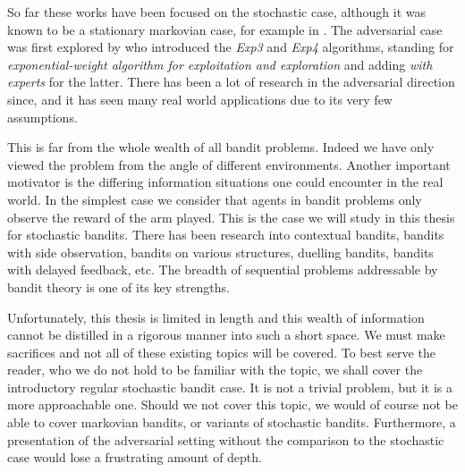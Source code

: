 So far these works have been focused on the stochastic case, although it was known to be a stationary markovian case, for example in \citet{gittins:1979} . The adversarial case was first explored by \citet{auer:1995} who introduced the {\em Exp3} and {\em Exp4} algorithms, standing for {\em exponential-weight algorithm for exploitation and exploration} and adding {\em with experts} for the latter. There has been a lot of research in the adversarial direction since, and it has seen many real world applications due to its very few assumptions.

\par This is far from the whole wealth of all bandit problems. Indeed we have only viewed the problem from the angle of different environments. Another important motivator is the differing information situations one could encounter in the real world. In the simplest case we consider that agents in bandit problems only observe the reward of the arm played. This is the case we will study in this thesis for stochastic bandits. There has been research into contextual bandits\cite{banditalgs:11}, bandits with side observation\cite{mannor:2011}, bandits on various structures\cite{kveton:2014}, duelling bandits\cite{yue:2009}, bandits with delayed feedback\cite{dudik:2011}, etc. The breadth of sequential problems addressable by bandit theory is one of its key strengths. %


	
	
\par Unfortunately, this thesis is limited in length and this wealth of information cannot be distilled in a rigorous manner into such a short space. We must make sacrifices and not all of these existing topics will be covered. To best serve the reader, who we do not hold to be familiar with the topic, we shall cover the introductory regular stochastic bandit case. It is not a trivial problem, but it is a more approachable one. Should we not cover this topic,  we would of course not be able to cover markovian bandits, or variants of stochastic bandits. Furthermore, a presentation of the adversarial setting without the comparison to the stochastic case would lose a frustrating amount of depth.  

